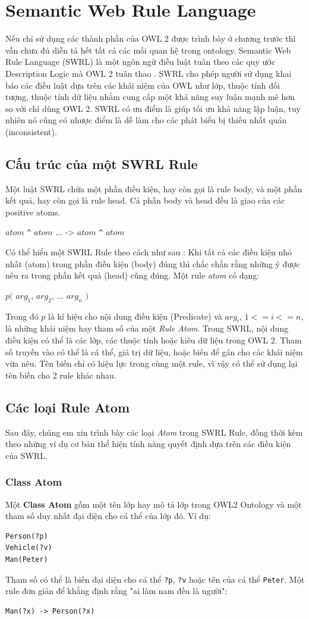 \section{Semantic Web Rule Language}
Nếu chỉ sử dụng các thành phần của OWL 2 được trình bày ở chương trước thì vẫn chưa đủ diễn tả hết tất cả các mối quan hệ trong ontology. Semantic Web Rule Language (SWRL) là một ngôn ngữ điều luật tuân theo các quy ước Description Logic mà OWL 2 tuân thao \cite{swrlfaq}. SWRL cho phép người sử dụng khai báo các điều luật dựa trên các khái niệm của OWL như lớp, thuộc tính đối tượng, thuộc tính dữ liệu nhằm cung cấp một khả năng suy luận mạnh mẽ hơn so với chỉ dùng OWL 2. SWRL có ưu điểm là giúp tối ưu khả năng lập luận, tuy nhiên nó cũng có nhược điểm là dễ làm cho các phát biểu bị thiếu nhất quán (inconsistent).

\subsection{Cấu trúc của một SWRL Rule \cite{swrlfaq}}
Một luật SWRL chứa một phần điều kiện, hay còn gọi là rule body, và một phần kết quả, hay còn gọi là rule head. Cả phần body và head đều là giao của các positive atoms.
\begin{center}
	$atom$ \verb|^| $atom$ ... -> $atom$ \verb|^| $atom$ 
\end{center}
Có thể hiểu một SWRL Rule theo cách như sau : Khi tất cả các điều kiện nhỏ nhất (atom) trong phần điều kiện (body) đúng thì chắc chắn rằng những ý được nêu ra trong phần kết quả (head) cũng đúng. Một rule \textit{atom} có dạng:
\begin{center}
	$p($ $arg_{1}$, $arg_{2}$, ... $arg_{n}$ $)$
\end{center}
Trong đó $p$ là kí hiệu cho nội dung điều kiện (Predicate) và $arg_{i}$, $1<=i<=n$, là những khái niệm hay tham số của một \textit{Rule Atom}. Trong SWRL, nội dung điều kiện có thể là các lớp, các thuộc tính hoặc kiêu dữ liệu trong OWL 2. Tham số truyền vào có thể là cá thể, giá trị dữ liệu, hoặc biến để gán cho các khái niệm vừa nêu. Tên biến chỉ có hiệu lực trong cùng một rule, vì vậy có thể sử dụng lại tên biến cho 2 rule khác nhau.
\subsection{Các loại Rule Atom}
Sau đây, chúng em xin trình bày các loại \textit{Atom} trong SWRL Rule, đồng thời kèm theo những ví dụ cơ bản thể hiện tính năng quyết định dựa trên các điều kiện của SWRL.
\subsubsection{Class Atom}
Một \textbf{Class Atom} gồm một tên lớp hay mô tả lớp trong OWL2 Ontology và một tham số duy nhất đại diện cho cá thể của lớp đó. Ví dụ:
\begin{verbatim}
Person(?p)
Vehicle(?v)
Man(Peter)
\end{verbatim}
Tham số có thể là biến đại diện cho cá thể \verb|?p|, \verb|?v| hoặc tên của cá thể \verb|Peter|.
Một rule đơn giản để khẳng định rằng "ai làm nam đều là người":
\begin{verbatim}
Man(?x) -> Person(?x)
\end{verbatim}
